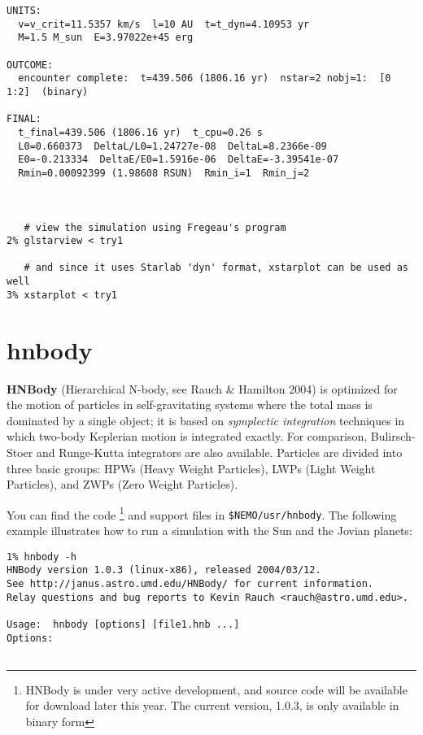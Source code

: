 {\begin{verbatim}
UNITS:
  v=v_crit=11.5357 km/s  l=10 AU  t=t_dyn=4.10953 yr
  M=1.5 M_sun  E=3.97022e+45 erg
 
OUTCOME:
  encounter complete:  t=439.506 (1806.16 yr)  nstar=2 nobj=1:  [0 1:2]  (binary)
 
FINAL:
  t_final=439.506 (1806.16 yr)  t_cpu=0.26 s
  L0=0.660373  DeltaL/L0=1.24727e-08  DeltaL=8.2366e-09
  E0=-0.213334  DeltaE/E0=1.5916e-06  DeltaE=-3.39541e-07
  Rmin=0.00092399 (1.98608 RSUN)  Rmin_i=1  Rmin_j=2



   # view the simulation using Fregeau's program
2% glstarview < try1

   # and since it uses Starlab 'dyn' format, xstarplot can be used as well
3% xstarplot < try1

\end{verbatim}\normalsize


\section{hnbody}

{\bf HNBody} (Hierarchical N-body, see Rauch \& Hamilton 2004)
is optimized for 
the motion of particles in self-gravitating systems where the total mass
is dominated by a single object; it is based on 
{\it symplectic integration} techniques 
in which two-body Keplerian motion is integrated exactly. 
For comparison, 
Bulirsch-Stoer and Runge-Kutta integrators are also available.
Particles are divided into three basic groups:
HPWs (Heavy Weight Particles), LWPs (Light Weight Particles), and
ZWPs (Zero Weight Particles).

You can find the code
\footnote{HNBody is under very active development, and source code will be 
available for download later this year. The current version, 1.0.3, is only
available in binary form}
and support files in {\tt \$NEMO/usr/hnbody}. The following example illustrates
how to run a simulation with the Sun and the Jovian planets:

\footnotesize\begin{verbatim}
1% hnbody -h
HNBody version 1.0.3 (linux-x86), released 2004/03/12.
See http://janus.astro.umd.edu/HNBody/ for current information.
Relay questions and bug reports to Kevin Rauch <rauch@astro.umd.edu>.
 
Usage:  hnbody [options] [file1.hnb ...]
Options:
 

\end{verbatim}}

